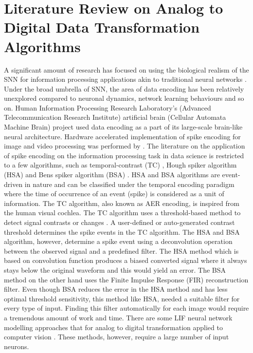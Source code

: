 \section{Literature Review on Analog to Digital Data Transformation Algorithms}
A significant amount of research has focused on using the biological realism of the SNN for information processing applications akin to traditional neural networks \citep{maass1997networks}. Under the broad umbrella of SNN, the area of data encoding has been relatively unexplored compared to neuronal dynamics, network learning behaviours and so on. Human Information Processing Research Laboratory's (Advanced Telecommunication Research Institute) artificial brain (Cellular Automata Machine Brain) project \citep{de1994artificial} used data encoding as a part of its large-scale brain-like neural architecture. Hardware accelerated implementation of spike encoding for image and video processing was performed by \citet{iakymchuk2014hardware}. The literature on the application of spike encoding on the information processing task in data science is restricted to a few algorithms, such as temporal-contrast (TC) \citep{kasabov2016evolving}, Hough spiker algorithm (HSA) \citep{hough1999spiker} and Bens spiker algorithm (BSA) \citep{schrauwen2003bsa}. HSA and BSA algorithms are event-driven in nature and can be classified under the temporal encoding paradigm where the time of occurrence of an event (spike) is considered as a unit of information. The TC algorithm, also known as AER encoding, is inspired from the human visual cochlea. The TC algorithm uses a threshold-based method to detect signal contrasts or changes \citep{kasabov2016evolving}. A user-defined or auto-generated contrast threshold determines the spike events in the TC algorithm. The HSA and BSA algorithm, however, determine a spike event using a deconvolution operation between the observed signal and a predefined filter. The HSA method which is based on convolution function produces a biased converted signal where it always stays below the original waveform and this would yield an error. The BSA method on the other hand uses the Finite Impulse Response (FIR)
reconstruction filter. Even though BSA reduces the error in the HSA method and has less optimal threshold sensitivity, this method like HSA, needed a suitable filter for every type of input. Finding this filter automatically for each image would require a tremendous amount of work and time. There are some LIF neural network modelling approaches that for analog to digital transformation applied to computer vision \citep{van1998face}. These methods, however, require a large number of input neurons. 

